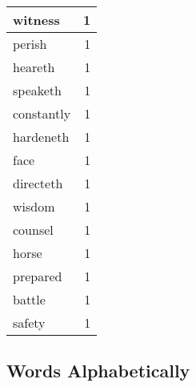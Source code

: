 \begin{center}
\begin{longtable}{l|r}
witness & 1\\ \hline 
perish & 1\\ \hline 
heareth & 1\\ \hline 
speaketh & 1\\ \hline 
constantly & 1\\ \hline 
hardeneth & 1\\ \hline 
face & 1\\ \hline 
directeth & 1\\ \hline 
wisdom & 1\\ \hline 
counsel & 1\\ \hline 
horse & 1\\ \hline 
prepared & 1\\ \hline 
battle & 1\\ \hline 
safety & 1\\ \hline 
\end{longtable}  
\end{center}  


  
\normalsize  

  
  


\subsection{Words Alphabetically}

